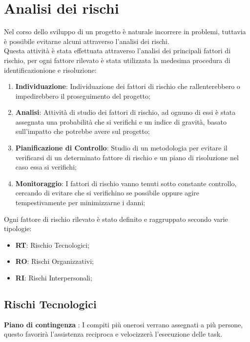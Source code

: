 \section{Analisi dei rischi}
	Nel corso dello sviluppo di un progetto è naturale incorrere in problemi, tuttavia è possibile evitarne alcuni attraverso l'analisi dei rischi. \\ Questa attività è stata effettuata attraverso l'analisi dei principali fattori di rischio, per ogni fattore rilevato è stata utilizzata la medesima procedura di identificazionione e risoluzione:
	\begin{enumerate}
		\item \textbf{Individuazione}: Individuazione dei fattori di rischio che rallenterebbero o impedirebbero il proseguimento del progetto;
		\item \textbf{Analisi}: Attività di studio dei fattori di rischio, ad ognuno di essi è stata assegnata una probabilità che si verifichi e un indice di gravità, basato sull'impatto che potrebbe avere sul progetto;
		\item \textbf{Pianificazione di Controllo}: Studio di un metodologia per evitare il verificarsi di un determinato fattore di rischio e un piano di risoluzione nel caso essa si verifichi;
		\item \textbf{Monitoraggio}: I fattori di rischio vanno tenuti sotto constante controllo, cercando di evitare che si verifichino se possibile oppure agire tempestivamente per minimizzarne i danni;
	\end{enumerate}
	Ogni fattore di rischio rilevato è stato definito e raggruppato secondo varie tipologie:
	\begin{itemize}
		\item \textbf{RT}: Rischio Tecnologici;
		\item \textbf{RO}: Rischi Organizzativi;
		\item \textbf{RI}: Rischi Interpersonali;
	\end{itemize}
	\subsection{Rischi Tecnologici}
	\def\productquality{
    		{
        		Inesperienza
			Tecnologica
			RT1,
        		La maggior parte delle tecnologie richieste nello sviluppo del progetto sono nuove per molti componenti del team, 
        		Il responsabile dovrà rilevare conoscenze e lacune dei vari componenti del team provando ad indicare una via ottimale per risolvere la mancanza di conoscenze,
        		Occorrenza: Alta 
			Pericolosità: Alta
    		},
	}
	
	\textbf{Piano di contingenza} : I compiti più onerosi verrano assegnati a più persone, questo favorirà l'assistenza reciproca e velocizzerà l'esecuzione delle task.
	\pagebreak
